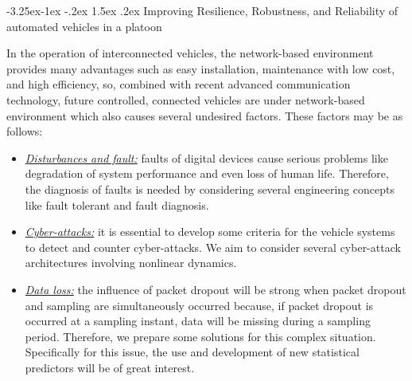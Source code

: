 \documentclass[a4paper,11pt]{article}
\makeatletter
\newcounter {subsubsubsection}[subsubsection]
\newcommand\subsubsubsection{\@startsection{subsubsubsection}{4}{\z@}%
                                     {-3.25ex\@plus -1ex \@minus -.2ex}%
                                     {1.5ex \@plus .2ex}%
                                     {\normalfont\normalsize\bfseries}}
\makeatother
\begin{document}
\vspace{-0.3cm}
%

\subsubsubsection{Improving Resilience, Robustness, and Reliability of automated vehicles in a platoon}

In the operation of interconnected vehicles, the network-based environment provides many advantages such as easy installation, maintenance with low cost, and high efficiency, so, combined with recent advanced communication technology, future controlled, connected vehicles are under network-based environment which also causes several undesired factors. These factors may be as follows:
\begin{itemize}
\vspace{-0.3cm}
\item \underline{\it Disturbances and fault:} faults of digital devices cause serious problems like degradation of system performance and even loss of human life. Therefore, the diagnosis of faults is needed by considering several engineering concepts like fault tolerant and fault diagnosis.
%
\vspace{-0.3cm}
\item \underline{\it Cyber-attacks:} it is essential to develop some criteria for the vehicle systems to detect and counter cyber-attacks. We aim to consider several cyber-attack architectures involving nonlinear dynamics.
%
\vspace{-0.3cm}
\item \underline{\it Data loss:} the influence of packet dropout will be strong when packet dropout and sampling are simultaneously occurred because, if packet dropout is occurred at a sampling instant, data will be missing during a sampling period. Therefore, we prepare some solutions for this complex situation. Specifically for this issue, the use and development of new statistical predictors will be of great interest.
\end{itemize}
\end{document}
